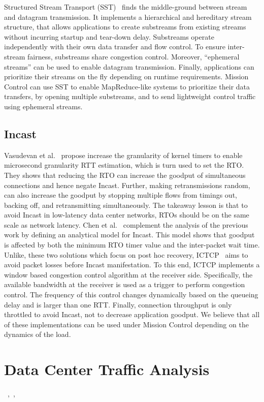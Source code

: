 \documentclass[a4paper,12pt,twoside,openright]{report}
\begin{document}
Structured Stream Transport (SST)~\cite{Ford:2007:SSN} finds the middle-ground
between stream and datagram transmission. It implements a hierarchical and
hereditary stream structure, that allows applications to create substreams from
existing streams without incurring startup and tear-down delay. Substreams
operate independently with their own data transfer and flow control. To ensure
inter-stream fairness, substreams share congestion control. Moreover,
``ephemeral streams'' can be used to enable datagram transmission. Finally,
applications can prioritize their streams on the fly depending on runtime
requirements. Mission Control can use SST to enable MapReduce-like systems to
prioritize their data transfers, by opening multiple substreams, and to send
lightweight control traffic using ephemeral streams.

\subsection{Incast}
Vasudevan et al.~\cite{Vasudevan:2009:SEF} propose increase the granularity of
kernel timers to enable microsecond granularity RTT estimation, which is turn
used to set the RTO. They shows that reducing the RTO can increase the goodput
of simultaneous connections and hence negate Incast. Further, making
retransmissions random, can also increase the goodput by stopping multiple flows
from timings out, backing off, and retransmitting simultaneously. The takeaway
lesson is that to avoid Incast in low-latency data center networks, RTOs should
be on the same scale as network latency. Chen et al.~\cite{Chen:2009:UTI}
complement the analysis of the previous work by defining an analytical model for
Incast. This model shows that goodput is affected by both the minimum RTO timer
value and the inter-packet wait time. Unlike, these two solutions which focus on
post hoc recovery, ICTCP~\cite{Wu:2010:IIC} aims to avoid packet losses before
Incast manifestation. To this end, ICTCP implements a window based congestion
control algorithm at the receiver side. Specifically, the available bandwidth at
the receiver is used as a trigger to perform congestion control.
The frequency of this control changes dynamically based on the queueing delay
and is larger than one RTT. Finally, connection throughput is only throttled to
avoid Incast, not to decrease application goodput. We believe that all of these
implementations can be used under Mission Control depending on the dynamics
of the load.

\section{Data Center Traffic Analysis}
~\cite{Benson:2010:NTC},~\cite{Benson:2009:UDC},~\cite{Kandula:2009:NDC}
\end{document}
